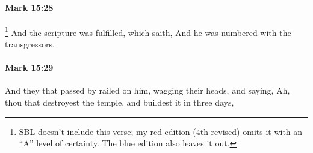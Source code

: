 		\paragraph{Mark 15:28} %
			\label{MARK-15-28}

				\footnote{%
					SBL doesn't include this verse; my red edition (4th revised) omits it with an ``A'' level of certainty. The blue edition also leaves it out.
					}%
			And the scripture was fulfilled, which saith, And he was numbered with the transgressors.

			\begin{framed}
			\scriptsize
				\begin{compactdesc}
					\item[SBLG] \gr{---}
				\end{compactdesc}
			\end{framed}

		\paragraph{Mark 15:29} %
			\label{MARK-15-29}

			And they that passed by railed on him, wagging their heads, and saying, Ah, thou that destroyest the temple, and buildest it in three days,

